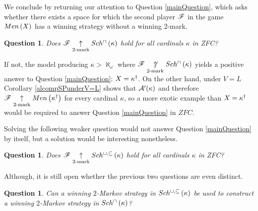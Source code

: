 \documentclass{rmmcart}
\theoremstyle{plain}
\newtheorem{question}[theorem]{Question}
\theoremstyle{definition}
\theoremstyle{remark}
\theoremstyle{plain}
\theoremstyle{definition}
\theoremstyle{remark}
\begin{document}
  We conclude by returning our attention to Question \ref{mainQuestion},
  which asks whether there exists a space for which the second player
  \(\mathscr{F}\) in the game \(Men\left({X}\right)\) has a winning strategy
  without a winning \(2\)-mark.

  \begin{question}
    Does
    \(\mathscr{F}\underset{2\text{-mark}}{\uparrow}Sch^{\cap}\left({\kappa}\right)\) hold for all cardinals
    \(\kappa\) in ZFC?
  \end{question}

  If not, the model producing \(\kappa>\aleph_\omega\) where
  \(\mathscr{F}\underset{2\text{-mark}}{\not\uparrow}Sch^{\cap}\left({\kappa}\right)\) yields a positive
  answer to Question \ref{mainQuestion}:
  \(X=\kappa^\dagger\). On the other hand, under \(V=L\)
  Corollary \ref{alcompSPunderV=L} shows that
  \(\mathcal{A}'(\kappa)\) and therefore
  \(\mathscr{F}\underset{2\text{-mark}}{\uparrow}Men\left({\kappa^\dagger}\right)\)
  for every cardinal \(\kappa\), so a more exotic example than
  \(X=\kappa^\dagger\) would be required to
  answer Question \ref{mainQuestion} in \(ZFC\).

  Solving the following weaker question would not answer Question
  \ref{mainQuestion} by itself, but a solution would be interesting nonetheless.

  \begin{question}
    Does
    \(\mathscr{F}\underset{2\text{-mark}}{\uparrow}Sch^{\cup,\subseteq}\left({\kappa}\right)\) hold for all cardinals
    \(\kappa\) in ZFC?
  \end{question}

  Although, it is still open whether the previous two questions are even
  distinct.

  \begin{question}
    Can a winning \(2\)-Markov strategy in \(Sch^{\cup,\subseteq}\left({\kappa}\right)\)
    be used to construct a winning \(2\)-Markov strategy in
    \(Sch^{\cap}\left({\kappa}\right)\)?
  \end{question}






\end{document}
